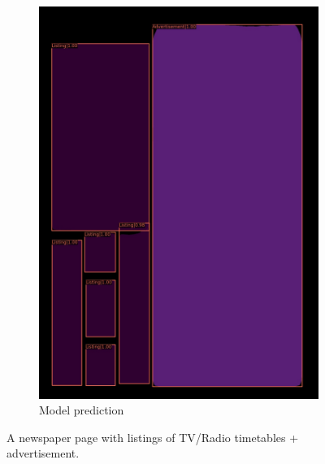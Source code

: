 \documentclass[aspectratio=1610]{beamer}
\begin{document}
\begin{frame}
\begin{figure}
\begin{subfigure}{.25\textwidth}
  \includegraphics[width=0.99\linewidth, clip=true, trim = 0mm 0mm 0mm 0mm]{figures/labels-vanilla-0.75/9rwJ51v.jpg}
  \caption{Model prediction}
\end{subfigure}
\caption{A newspaper page with listings of TV/Radio timetables + advertisement.}
\label{fig:stocks}
\end{figure}
\end{frame}
\normalpage
\end{document}
